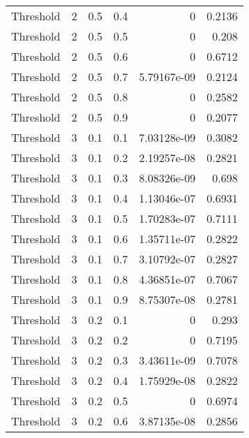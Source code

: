 \documentclass{article}
\begin{document}
\begin{longtable}[H]{lrrrrr}
 Threshold      &       2 &   0.5 &            0.4 &   0           &          0.2136 \\
 Threshold      &       2 &   0.5 &            0.5 &   0           &          0.208  \\
 Threshold      &       2 &   0.5 &            0.6 &   0           &          0.6712 \\
 Threshold      &       2 &   0.5 &            0.7 &   5.79167e-09 &          0.2124 \\
 Threshold      &       2 &   0.5 &            0.8 &   0           &          0.2582 \\
 Threshold      &       2 &   0.5 &            0.9 &   0           &          0.2077 \\
 Threshold      &       3 &   0.1 &            0.1 &   7.03128e-09 &          0.3082 \\
 Threshold      &       3 &   0.1 &            0.2 &   2.19257e-08 &          0.2821 \\
 Threshold      &       3 &   0.1 &            0.3 &   8.08326e-09 &          0.698  \\
 Threshold      &       3 &   0.1 &            0.4 &   1.13046e-07 &          0.6931 \\
 Threshold      &       3 &   0.1 &            0.5 &   1.70283e-07 &          0.7111 \\
 Threshold      &       3 &   0.1 &            0.6 &   1.35711e-07 &          0.2822 \\
 Threshold      &       3 &   0.1 &            0.7 &   3.10792e-07 &          0.2827 \\
 Threshold      &       3 &   0.1 &            0.8 &   4.36851e-07 &          0.7067 \\
 Threshold      &       3 &   0.1 &            0.9 &   8.75307e-08 &          0.2781 \\
 Threshold      &       3 &   0.2 &            0.1 &   0           &          0.293  \\
 Threshold      &       3 &   0.2 &            0.2 &   0           &          0.7195 \\
 Threshold      &       3 &   0.2 &            0.3 &   3.43611e-09 &          0.7078 \\
 Threshold      &       3 &   0.2 &            0.4 &   1.75929e-08 &          0.2822 \\
 Threshold      &       3 &   0.2 &            0.5 &   0           &          0.6974 \\
 Threshold      &       3 &   0.2 &            0.6 &   3.87135e-08 &          0.2856 \\

\end{longtable}
\end{document}
